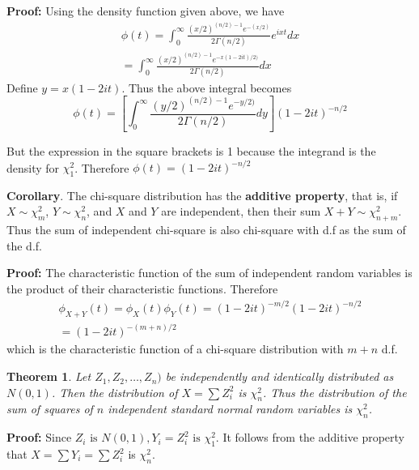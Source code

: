 \documentclass{article}
\newtheorem{theorem}{Theorem}[section]
\begin{document}
\textbf{Proof:} Using the density function given above, we have
\begin{equation*}
    \begin{split}
        \phi(t)=\int_0^{\infty} \frac{(x/2)^{(n/2)-1}e^{-(x/2)}}{2 \Gamma(n/2)} e^{ixt} dx \\
        = \int_0^{\infty} \frac{(x/2)^{(n/2)-1}e^{-x(1-2it)/2)}}{2 \Gamma(n/2)} dx
    \end{split}
\end{equation*}
Define \(y=x(1-2it)\). Thus the above integral becomes
\begin{equation*}
    \phi(t)=\left[ \int_0^{\infty} \frac{(y/2)^{(n/2)-1}e^{-y/2)}}{2 \Gamma(n/2)} dy \right] (1-2it)^{-n/2}
\end{equation*}

But the expression in the square brackets is 1 because the integrand is the density for \(\chi_1^2\). Therefore \(\phi(t)=(1-2it)^{-n/2}\)

\textbf{Corollary}. The chi-square distribution has the \textbf{additive property}, that is, if \(X\sim\chi_m^2\), \(Y\sim\chi_n^2\), and \(X\) and \(Y\) are independent, then their sum \(X+Y\sim\chi_{n+m}^2\). Thus the sum of independent chi-square is also chi-square with d.f as the sum of the d.f.

\textbf{Proof:} The characteristic function of the sum of independent random variables is the product of their characteristic functions. Therefore
\begin{equation*}
    \begin{split}
        \phi_{X+Y}(t)=\phi_X(t)\phi_Y(t)=(1-2it)^{-m/2} (1-2it)^{-n/2}\\
        = (1-2it)^{-(m+n)/2}
    \end{split}
\end{equation*}
which is the characteristic function of a chi-square distribution with \(m+n\) d.f.

\begin{theorem}
    Let \(Z_1, Z_2,\dots,Z_n)\) be independently and identically distributed as \(N(0,1)\). Then the distribution of \(X=\sum Z_i^2\) is \(\chi_n^2\). Thus the distribution of the sum of squares of \(n\) independent standard normal random variables is \(\chi_n^2\).
\end{theorem}

\textbf{Proof:} Since \(Z_i \text{ is } N(0,1), Y_i=Z_i^2 \text{ is } \chi_1^2\). It follows from the additive property that \(X=\sum Y_i=\sum Z_i^2\) is \(\chi_n^2\).
\end{document}
